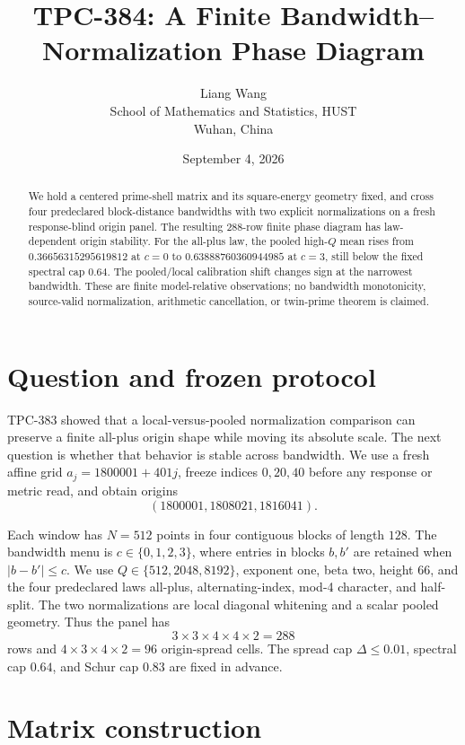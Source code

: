 \documentclass[10pt]{article}
\title{TPC-384: A Finite Bandwidth--Normalization Phase Diagram}
\author{Liang Wang\\School of Mathematics and Statistics, HUST\\Wuhan, China}
\date{September 4, 2026}
\begin{document}
\maketitle

\begin{abstract}
We hold a centered prime-shell matrix and its square-energy geometry fixed,
and cross four predeclared block-distance bandwidths with two explicit
normalizations on a fresh response-blind origin panel.  The resulting
288-row finite phase diagram has law-dependent origin stability.  For the
all-plus law, the pooled high-\(Q\) mean rises from \(0.36656315295619812\)
at \(c=0\) to \(0.63888760360944985\) at \(c=3\), still below the fixed
spectral cap \(0.64\).  The pooled/local calibration shift changes sign at
the narrowest bandwidth.  These are finite model-relative observations; no
bandwidth monotonicity, source-valid normalization, arithmetic cancellation,
or twin-prime theorem is claimed.
\end{abstract}

\section{Question and frozen protocol}

TPC-383 showed that a local-versus-pooled normalization comparison can
preserve a finite all-plus origin shape while moving its absolute scale.  The
next question is whether that behavior is stable across bandwidth.  We use a
fresh affine grid \(a_j=1800001+401j\), freeze indices \(0,20,40\) before any
response or metric read, and obtain origins
\[
 (1800001,1808021,1816041).
\]

Each window has \(N=512\) points in four contiguous blocks of length \(128\).
The bandwidth menu is \(c\in\{0,1,2,3\}\), where entries in blocks \(b,b'\)
are retained when \(\lvert b-b'\rvert\leq c\).  We use
\(Q\in\{512,2048,8192\}\), exponent one, beta two, height 66, and the four
predeclared laws all-plus, alternating-index, mod-4 character, and
half-split.  The two normalizations are local diagonal whitening and a scalar
pooled geometry.  Thus the panel has
\[
3\times3\times4\times4\times2=288
\]
rows and \(4\times3\times4\times2=96\) origin-spread cells.  The spread cap
\(\Delta\leq0.01\), spectral cap \(0.64\), and Schur cap \(0.83\) are fixed in
advance.

\section{Matrix construction}
\end{document}
